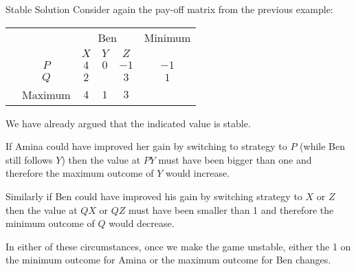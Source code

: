\documentclass[8pt]{beamer}
\begin{document}
\begin{frame}{Stable Solution}
	Consider again the pay-off matrix from the previous example:

		\begin{center}
\colorbox{cc}{
	\setlength\arrayrulewidth{0.5mm}
\begin{tabular}{cc|cccc}
	\multicolumn{2}{c}{} & \multicolumn{3}{c}{Ben} & Minimum \\
	\multicolumn{1}{c}{} &  & $X$  & $Y$ & $Z$ & \\ \hline
	\raisebox{0.0cm}{\multirow{2}*{\rotatebox{90}{Amina}}}  & $P$ & $4$ & $0$ & $-1$ & $-1$ \\
								& $Q$ & $2$ & \sol{$1$} & $3$ & $1$\\
							       & Maximum & $4$ &  $1$ &  $3$ & \\
\end{tabular}}
\end{center}

We have already argued that the indicated value is stable.

If Amina could have improved her gain by switching to strategy to $P$ (while Ben still follows $Y$) then the value at $PY$ must have been bigger than one and therefore the maximum outcome of $Y$ would increase.

Similarly if Ben could have improved his gain by switching strategy to $X$ or $Z$ then the value at $QX$ or $QZ$ must have been smaller than 1 and therefore the minimum outcome of $Q$ would decrease.

In either of these circumstances, once we make the game unstable, either the 1 on the minimum outcome for Amina or the maximum outcome for Ben changes.
\end{frame}
\end{document}
